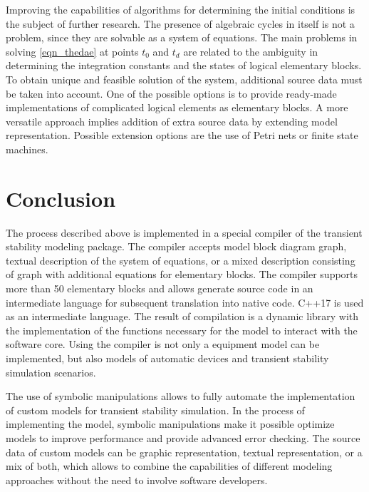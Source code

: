 \documentclass[lettersize,journal]{IEEEtran}
\begin{document}
Improving the capabilities of algorithms for determining the initial conditions is the subject of further research. 
The presence of algebraic cycles in itself is not a problem, since they are solvable as a system of equations. The main 
problems in solving \eqref{eqn_thedae} at points \(t_0\) and \(t_d\) are related to the ambiguity in determining the 
integration constants and the states of logical elementary blocks. To obtain unique and feasible solution of the system, 
additional source data must be taken into account. One of the possible options is to provide ready-made implementations 
of complicated logical elements as elementary blocks. A more versatile approach implies addition of extra source data by 
extending model representation. Possible extension options are the use of Petri nets or finite state machines.

\section{Conclusion}

The process described above is implemented in a special compiler of the transient stability modeling package. The compiler accepts
model block diagram graph, textual description of the system of equations, or a mixed description consisting of
graph with additional equations for elementary blocks. The compiler supports more than 50 elementary blocks and allows
generate source code in an intermediate language for subsequent translation into native code. C++17 is used as an intermediate language. 
The result of compilation is a dynamic library with the implementation of the functions necessary for the model to interact with the software core. 
Using the compiler is not only a equipment model can be implemented, but also models of automatic devices and transient stability simulation scenarios.

The use of symbolic manipulations allows to fully automate the implementation of custom models
for transient stability simulation. In the process of implementing the model, symbolic manipulations make it possible
optimize models to improve performance and provide advanced error checking. The source data of custom models can be graphic
representation, textual representation, or a mix of both, which allows to combine the capabilities of different modeling
approaches without the need to involve software developers.
\end{document}
